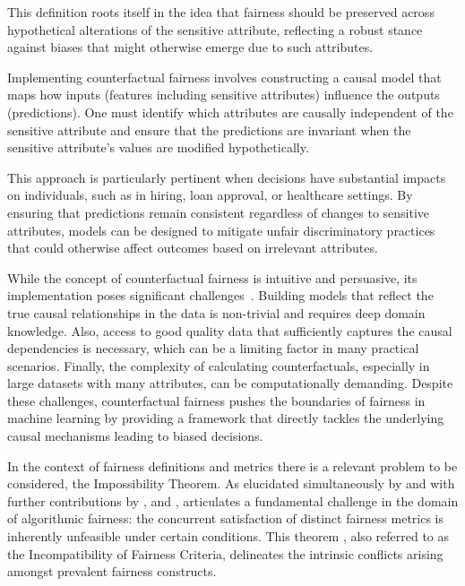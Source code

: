 This definition roots itself in the idea that fairness should be preserved across hypothetical alterations of the sensitive attribute, reflecting a robust stance against biases that might otherwise emerge due to such attributes.

Implementing counterfactual fairness involves constructing a causal model that maps how inputs (features including sensitive attributes) influence the outputs (predictions). One must identify which attributes are causally independent of the sensitive attribute and ensure that the predictions are invariant when the sensitive attribute's values are modified hypothetically.

This approach is particularly pertinent when decisions have substantial impacts on individuals, such as in hiring, loan approval, or healthcare settings. By ensuring that predictions remain consistent regardless of changes to sensitive attributes, models can be designed to mitigate unfair discriminatory practices that could otherwise affect outcomes based on irrelevant attributes.

While the concept of counterfactual fairness is intuitive and persuasive, its implementation poses significant challenges~\cite{Kasirzadeh2021}. Building models that reflect the true causal relationships in the data is non-trivial and requires deep domain knowledge. Also, access to good quality data that sufficiently captures the causal dependencies is necessary, which can be a limiting factor in many practical scenarios. Finally, the complexity of calculating counterfactuals, especially in large datasets with many attributes, can be computationally demanding. Despite these challenges, counterfactual fairness pushes the boundaries of fairness in machine learning by providing a framework that directly tackles the underlying causal mechanisms leading to biased decisions.

In the context of fairness definitions and metrics there is a relevant problem to be considered, the Impossibility Theorem. As elucidated simultaneously by \cite{Kleinberg2017} and \cite{Chouldechova2017} with further contributions by \cite{Saravanakumar2020}, \cite{Bell2023} and \cite{Beigang2023}, articulates a fundamental challenge in the domain of algorithmic fairness: the concurrent satisfaction of distinct fairness metrics is inherently unfeasible under certain conditions. This theorem , also referred to as the Incompatibility of Fairness Criteria, delineates the intrinsic conflicts arising amongst prevalent fairness constructs.

